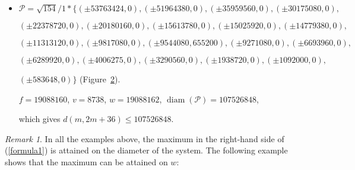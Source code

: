 \documentclass[12pt]{article}
\theoremstyle{theorem}
\theoremstyle{dfn}
\theoremstyle{remark}
\newtheorem{remark}{Remark}
\begin{document}
\begin{itemize}
$
(\pm 20180160, 0),
(\pm 15613780, 0),
(\pm 15025920, 0),
(\pm 14779380, 0),
(\pm 11313120, 0),
$

$
(\pm 9817080, 0),
(\pm 9544080, 655200),
(\pm 9271080, 0),
(\pm 6693960, 0),
(\pm 6289920, 0),
$

$
(\pm 4006275, 0),
(\pm 3290560, 0),
(\pm 1938720, 0),
(\pm 1092000, 0),
$

$
(\pm 583648, 0),
(-53763424 , 0)\}
$
(Figure~\ref{picture_39.png}).

$f = 19088160$, $v = 8738$, $w = 19088162$, $\operatorname{diam(\mathcal{P})} = 105727804$,

which gives $d(m, 2m + 35) \leq 105727804$.


\begin{figure}[h!]
\parbox{1\linewidth}{\caption{PIPS of cardinality 39 and diameter 105727804}
\label{picture_39.png}}
\end{figure}


\begin{figure}[h!]
	\begin{center}
	\texttt{[image: picture\_40.png]}
	\parbox{1\linewidth}{\caption{PIPS of cardinality 40 and diameter 107526848}
	\label{picture_40.png}}
	\end{center}
\end{figure}


\item
$\mathcal{P}=\sqrt{154}/{1} * \{ (\pm 53763424, 0),
(\pm 51964380 , 0),
(\pm 35959560 , 0),
(\pm 30175080 , 0),
$

$
(\pm 22378720 , 0),
(\pm 20180160 , 0),
(\pm 15613780 , 0),
(\pm 15025920 , 0),
(\pm 14779380 , 0),
$

$
(\pm 11313120 , 0),
(\pm 9817080 , 0),
(\pm 9544080 , 655200),
(\pm 9271080 , 0),
(\pm 6693960 , 0),
$

$
(\pm 6289920 , 0),
(\pm 4006275 , 0),
(\pm 3290560 , 0),
(\pm 1938720 , 0),
(\pm 1092000 , 0),
$

$
(\pm 583648 , 0)\}
$
(Figure~\ref{picture_40.png}).

$f = 19088160$, $v = 8738$, $w = 19088162$, $\operatorname{diam}(\mathcal{P})
= 107526848$,

which gives $d(m, 2m + 36) \leq 107526848$.

\end{itemize}

\begin{remark}
In all the examples above, the maximum in the right-hand side of (\ref{formula1})
is attained on the diameter of the system.
The following example shows that the maximum can be attained on $w$:
\end{remark}
\end{document}
